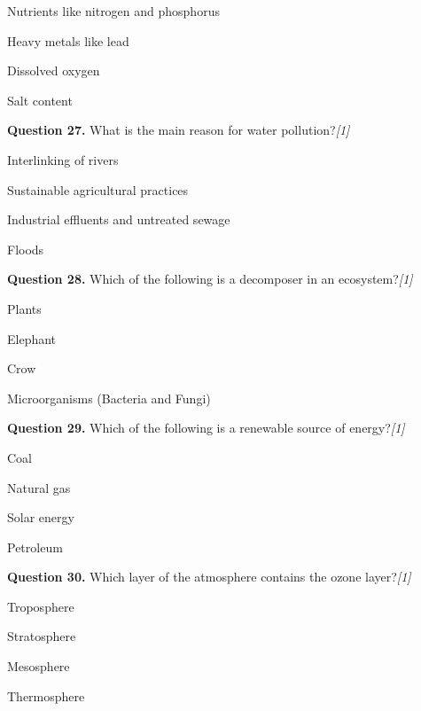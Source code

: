 \documentclass[11pt,a4paper]{article}
\newcommand{\pts}[1]{\hfill   \textit{[#1]}}
\begin{document}
\begin{parts}
  \item Nutrients like nitrogen and phosphorus
  \item Heavy metals like lead
  \item Dissolved oxygen
  \item Salt content
\end{parts}

\medskip


\noindent   \textbf{Question 27.} What is the main reason for water pollution?\pts{1}

\begin{parts}
  \item Interlinking of rivers
  \item Sustainable agricultural practices
  \item Industrial effluents and untreated sewage
  \item Floods
\end{parts}

\medskip


\noindent   \textbf{Question 28.} Which of the following is a decomposer in an ecosystem?\pts{1}

\begin{parts}
  \item Plants
  \item Elephant
  \item Crow
  \item Microorganisms (Bacteria and Fungi)
\end{parts}

\medskip


\noindent   \textbf{Question 29.} Which of the following is a renewable source of energy?\pts{1}

\begin{parts}
  \item Coal
  \item Natural gas
  \item Solar energy
  \item Petroleum
\end{parts}

\medskip


\noindent   \textbf{Question 30.} Which layer of the atmosphere contains the ozone layer?\pts{1}

\begin{parts}
  \item Troposphere
  \item Stratosphere
  \item Mesosphere
  \item Thermosphere
\end{parts}
\end{document}
